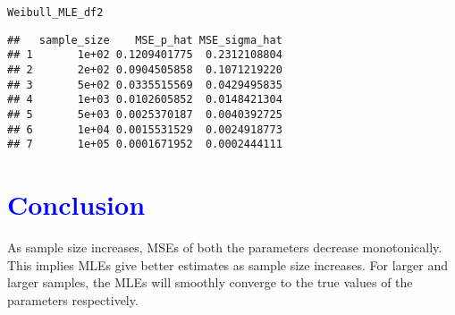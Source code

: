 \documentclass[11pt, a4paper]{article}\usepackage[]{graphicx}\usepackage[]{xcolor}
\makeatletter
\newcommand{\hldef}[1]{\textcolor[rgb]{0.345,0.345,0.345}{#1}}%
\newenvironment{kframe}{%
 \def\at@end@of@kframe{}%
 \ifinner\ifhmode%
  \def\at@end@of@kframe{\end{minipage}}%
  \begin{minipage}{\columnwidth}%
 \fi\fi%
 \def\FrameCommand##1{\hskip\@totalleftmargin \hskip-\fboxsep
 \colorbox{shadecolor}{##1}\hskip-\fboxsep
     \hskip-\linewidth \hskip-\@totalleftmargin \hskip\columnwidth}%
 \MakeFramed {\advance\hsize-\width
   \@totalleftmargin\z@ \linewidth\hsize
   \@setminipage}}%
 {\par\unskip\endMakeFramed%
 \at@end@of@kframe}
\newenvironment{knitrout}{}{} %
\makeatother
\begin{document}
\begin{knitrout}
\color{fgcolor}\begin{kframe}
\begin{alltt}
\hldef{Weibull_MLE_df2}
\end{alltt}
\begin{verbatim}
##   sample_size    MSE_p_hat MSE_sigma_hat
## 1       1e+02 0.1209401775  0.2312108804
## 2       2e+02 0.0904505858  0.1071219220
## 3       5e+02 0.0335515569  0.0429495835
## 4       1e+03 0.0102605852  0.0148421304
## 5       5e+03 0.0025370187  0.0040392725
## 6       1e+04 0.0015531529  0.0024918773
## 7       1e+05 0.0001671952  0.0002444111
\end{verbatim}
\end{kframe}
\end{knitrout}


\section*{\faArrowAltCircleRight[regular] \textcolor{blue}{Conclusion}}

\smallpencil \hspace{0.3cm} {\setlength{\spaceskip}{1em plus 0.5em minus 0.5em} \fontsize{17}{20}\myfont As sample size increases, MSEs of both the parameters decrease monotonically. This implies MLEs give better estimates as sample size increases. For larger and larger samples, the MLEs will smoothly converge to the true values of the parameters respectively. \par}
\end{document}
